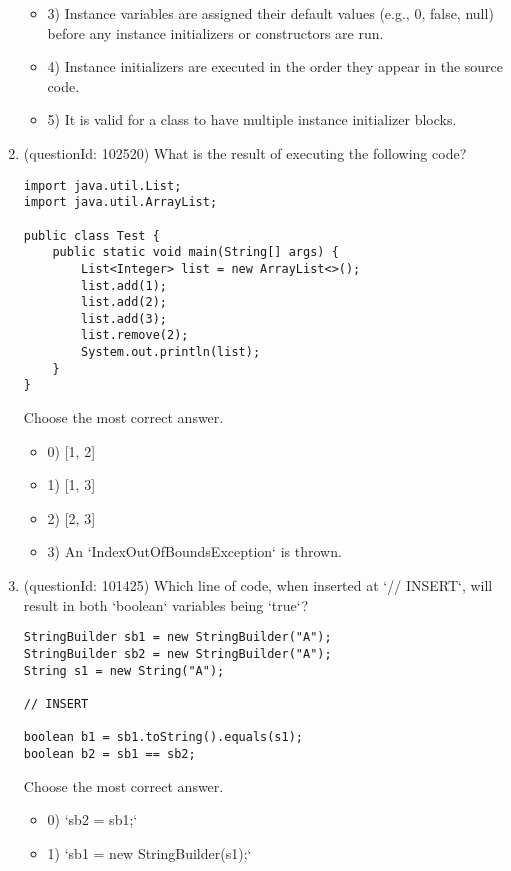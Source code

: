 \documentclass[12pt]{article}
\begin{document}
\begin{enumerate}[label=(\arabic*)]
\begin{itemize}
\item 3) Instance variables are assigned their default values (e.g., 0, false, null) before any instance initializers or constructors are run.

\item 4) Instance initializers are executed in the order they appear in the source code.

\item 5) It is valid for a class to have multiple instance initializer blocks.

\end{itemize}
\item (questionId: 102520) What is the result of executing the following code?\begin{verbatim}
import java.util.List;
import java.util.ArrayList;

public class Test {
    public static void main(String[] args) {
        List<Integer> list = new ArrayList<>();
        list.add(1);
        list.add(2);
        list.add(3);
        list.remove(2);
        System.out.println(list);
    }
}
\end{verbatim}
Choose the most correct answer. 
\begin{itemize}
\item 0) [1, 2]

\item 1) [1, 3]

\item 2) [2, 3]

\item 3) An `IndexOutOfBoundsException` is thrown.

\end{itemize}
\item (questionId: 101425) Which line of code, when inserted at `// INSERT`, will result in both `boolean` variables being `true`?
\begin{verbatim}
StringBuilder sb1 = new StringBuilder("A");
StringBuilder sb2 = new StringBuilder("A");
String s1 = new String("A");

// INSERT

boolean b1 = sb1.toString().equals(s1);
boolean b2 = sb1 == sb2;
\end{verbatim}
Choose the most correct answer. 
\begin{itemize}
\item 0) `sb2 = sb1;`

\item 1) `sb1 = new StringBuilder(s1);`


\end{itemize}
\end{enumerate}
\end{document}
